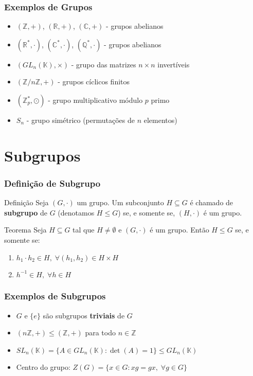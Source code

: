 \documentclass{beamer}
\begin{document}
\begin{frame}
\frametitle{Exemplos de Grupos}

\begin{itemize}
\item $(\mathbb{Z}, +)$, $(\mathbb{R}, +)$, $(\mathbb{C}, +)$ - grupos abelianos
\pause
\item $(\mathbb{R}^*, \cdot)$, $(\mathbb{C}^*, \cdot)$, $(\mathbb{Q}^*, \cdot)$ - grupos abelianos
\pause
\item $(GL_n(\mathbb{K}), \times)$ - grupo das matrizes $n\times n$ invertíveis
\pause
\item $(\mathbb{Z}/n\mathbb{Z}, +)$ - grupos cíclicos finitos
\pause
\item $(\mathbb{Z}_p^*, \odot)$ - grupo multiplicativo módulo $p$ primo
\pause
\item $S_n$ - grupo simétrico (permutações de $n$ elementos)
\end{itemize}

\end{frame}

\section{Subgrupos}

\begin{frame}
\frametitle{Definição de Subgrupo}

\begin{block}{Definição}
Seja $(G, \cdot)$ um grupo. Um subconjunto $H \subseteq G$ é chamado de \textbf{subgrupo} de $G$ (denotamos $H \leq G$) se, e somente se, $(H, \cdot)$ é um grupo.
\end{block}

\pause

\begin{alertblock}{Teorema}
Seja $H \subseteq G$ tal que $H \neq \emptyset$ e $(G, \cdot)$ é um grupo. Então $H \leq G$ se, e somente se:
\begin{enumerate}
\item $h_1 \cdot h_2 \in H,\; \forall (h_1,h_2) \in H \times H$
\item $h^{-1} \in H, \; \forall h\in H$
\end{enumerate}
\end{alertblock}

\end{frame}

\begin{frame}
\frametitle{Exemplos de Subgrupos}

\begin{itemize}
\item $G$ e $\{e\}$ são subgrupos \textbf{triviais} de $G$
\pause
\item $(n\mathbb{Z}, +) \leq (\mathbb{Z}, +)$ para todo $n \in \mathbb{Z}$
\pause
\item $SL_n(\mathbb{K}) = \{A \in GL_n(\mathbb{K}) : \det(A) = 1\} \leq GL_n(\mathbb{K})$
\pause
\item Centro do grupo: $Z(G) = \{x \in G : xg = gx, \; \forall g \in G\}$
\end{itemize}

\end{frame}
\end{document}
